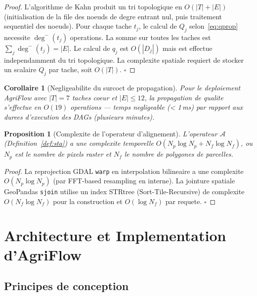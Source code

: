 \documentclass[12pt,a4paper]{article}
\theoremstyle{plain}
\newtheorem{proposition}[theorem]{Proposition}
\newtheorem{corollary}[theorem]{Corollaire}
\theoremstyle{definition}
\theoremstyle{remark}
\begin{document}
\begin{proof}
L'algorithme de Kahn produit un tri topologique en $O(|T|+|E|)$
(initialisation de la file des noeuds de degre entrant nul, puis
traitement sequentiel des noeuds). Pour chaque tache $t_j$, le calcul
de $Q_j$ selon~\eqref{eq:qprop} necessite $\deg^{-}(t_j)$ operations.
La somme sur toutes les taches est
$\sum_{j} \deg^{-}(t_j) = |E|$. Le calcul de $q_j$ est $O(|D_j|)$
mais est effectue independamment du tri topologique.
La complexite spatiale requiert de stocker un scalaire $Q_j$ par tache,
soit $O(|T|)$. \hfill$\square$
\end{proof}

\begin{corollary}[Negligeabilite du surcoct de propagation]
Pour le deploiement AgriFlow avec $|T|=7$ taches coeur et $|E|\leq 12$,
la propagation de qualite s'effectue en $O(19)$ operations --- temps
negligeable (< 1\,ms) par rapport aux durees d'execution des DAGs
(plusieurs minutes).
\end{corollary}

\begin{proposition}[Complexite de l'operateur d'alignement]
\label{prop:sta_complexity}
L'operateur $\mathcal{A}$ (Definition~\ref{def:sta}) a une complexite
temporelle $O(N_p \log N_p + N_f \log N_f)$, ou $N_p$ est le nombre
de pixels raster et $N_f$ le nombre de polygones de parcelles.
\end{proposition}

\begin{proof}
La reprojection GDAL \texttt{warp} en interpolation bilineaire
a une complexite $O(N_p \log N_p)$ (par FFT-based resampling en interne).
La jointure spatiale GeoPandas \texttt{sjoin} utilise un index STRtree
(Sort-Tile-Recursive) de complexite $O(N_f \log N_f)$ pour la construction
et $O(\log N_f)$ par requete. \hfill$\square$
\end{proof}

\section{Architecture et Implementation d'AgriFlow}
\label{sec:architecture}

\subsection{Principes de conception}
\end{document}

